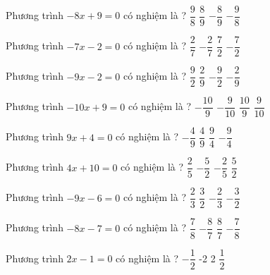 \begin{ex} 
	Phương trình $-8x+9=0$ có nghiệm là ? 
	\choice
	{\True $ \dfrac{ 9 }{ 8 } $}
	{$ \dfrac{ 8 }{ 9 } $}
	{$- \dfrac{ 8 }{ 9 } $}
	{$- \dfrac{ 9 }{ 8 } $}
	\loigiai{} 
\end{ex}

\begin{ex} 
	Phương trình $-7x-2=0$ có nghiệm là ? 
	\choice
	{$ \dfrac{ 2 }{ 7 } $}
	{\True $- \dfrac{ 2 }{ 7 } $}
	{$ \dfrac{ 7 }{ 2 } $}
	{$- \dfrac{ 7 }{ 2 } $}
	\loigiai{} 
\end{ex}

\begin{ex} 
	Phương trình $-9x-2=0$ có nghiệm là ? 
	\choice
	{$ \dfrac{ 9 }{ 2 } $}
	{$ \dfrac{ 2 }{ 9 } $}
	{$- \dfrac{ 9 }{ 2 } $}
	{\True $- \dfrac{ 2 }{ 9 } $}
	\loigiai{} 
\end{ex}

\begin{ex} 
	Phương trình $-10x+9=0$ có nghiệm là ? 
	\choice
	{$- \dfrac{ 10 }{ 9 } $}
	{$- \dfrac{ 9 }{ 10 } $}
	{$ \dfrac{ 10 }{ 9 } $}
	{\True $ \dfrac{ 9 }{ 10 } $}
	\loigiai{} 
\end{ex}

\begin{ex} 
	Phương trình $9x+4=0$ có nghiệm là ? 
	\choice
	{\True $- \dfrac{ 4 }{ 9 } $}
	{$ \dfrac{ 4 }{ 9 } $}
	{$ \dfrac{ 9 }{ 4 } $}
	{$- \dfrac{ 9 }{ 4 } $}
	\loigiai{} 
\end{ex}

\begin{ex} 
	Phương trình $4x+10=0$ có nghiệm là ? 
	\choice
	{$ \dfrac{ 2 }{ 5 } $}
	{\True $- \dfrac{ 5 }{ 2 } $}
	{$- \dfrac{ 2 }{ 5 } $}
	{$ \dfrac{ 5 }{ 2 } $}
	\loigiai{} 
\end{ex}

\begin{ex} 
	Phương trình $-9x-6=0$ có nghiệm là ? 
	\choice
	{$ \dfrac{ 2 }{ 3 } $}
	{$ \dfrac{ 3 }{ 2 } $}
	{\True $- \dfrac{ 2 }{ 3 } $}
	{$- \dfrac{ 3 }{ 2 } $}
	\loigiai{} 
\end{ex}

\begin{ex} 
	Phương trình $-8x-7=0$ có nghiệm là ? 
	\choice
	{$ \dfrac{ 7 }{ 8 } $}
	{$- \dfrac{ 8 }{ 7 } $}
	{$ \dfrac{ 8 }{ 7 } $}
	{\True $- \dfrac{ 7 }{ 8 } $}
	\loigiai{} 
\end{ex}

\begin{ex} 
	Phương trình $2x-1=0$ có nghiệm là ? 
	\choice
	{$- \dfrac{ 1 }{ 2 } $}
	{-2}
	{2}
	{\True $ \dfrac{ 1 }{ 2 } $}
	\loigiai{} 
\end{ex}


